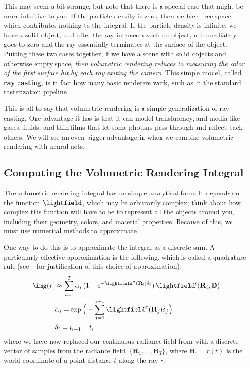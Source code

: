 This may seem a bit strange, but note that there is a special case that might be more intuitive to you. If the particle density is zero, then we have free space, which contributes nothing to the integral. If the particle density is infinite, we have a solid object, and after the ray intersects such an object, $\alpha$ immediately goes to zero and the ray essentially terminates at the surface of the object. Putting these two cases together, if we have a scene with solid objects and otherwise empty space, \textit{then volumetric rendering reduces to measuring the color of the first surface hit by each ray exiting the camera}. This simple model, called \textbf{ray casting}, is in fact how many basic renderers work, such as in the standard rasterization pipeline~\cite{shirley2009fundamentals}. 

This is all to say that volumetric rendering is a simple generalization of ray casting. One advantage it has is that it can model translucency, and media like gases, fluids, and thin films that let some photons pass through and reflect back others. We will see an even bigger advantage in \sect{\ref{sec:nerfs:nerf_section}} when we combine volumetric rendering with neural nets.

\subsection{Computing the Volumetric Rendering Integral}

The volumetric rendering integral has no simple analytical form. It depends on the function $\lightfield$, which may be arbitrarily complex; think about how complex this function will have to be to represent all the objects around you, including their geometry, colors, and material properties. Because of this, we must use numerical methods to approximate \eqn{\ref{eqn:nerfs:vol_rendering_integral}}.

One way to do this is to approximate the integral as a discrete sum. A particularly effective approximation is the following, which is called a quadrature rule (see ~\cite{max1995optical,max2005local} for justification of this choice of approximation):
\begin{align}
    \img(r) &\approx \sum_{i=1}^T \alpha_i \, (1-e^{-\lightfield^\sigma(\mathbf{R}_i)\delta_i}) \, \lightfield^c(\mathbf{R}_i, \mathbf{D})\\
    &\alpha_i = \exp\Big(-\sum_{j=1}^{i-1} \lightfield^\sigma(\mathbf{R}_j)\delta_j\Big)\\
    &\delta_i = t_{i+1} - t_i
\end{align}
where we have now replaced our continuous radiance field from \eqn{\ref{eqn:nerfs:vol_rendering_integral}} with a discrete vector of samples from the radiance field, $\{\mathbf{R}_1, \ldots, \mathbf{R}_T\}$, where $\mathbf{R}_t = r(t)$ is the world coordinate of a point distance $t$ along the ray $r$.

